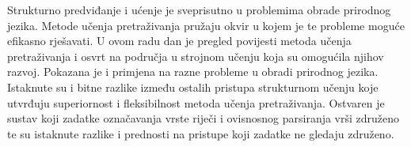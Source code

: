 \begin{sazetak}
Strukturno predviđanje i ućenje je sveprisutno u problemima obrade prirodnog
jezika. Metode učenja pretraživanja pružaju okvir u kojem je te probleme moguće
efikasno rješavati. U ovom radu dan je pregled povijesti metoda učenja
pretraživanja i osvrt na područja u strojnom učenju koja su omogućila njihov
razvoj. Pokazana je i primjena na razne probleme u obradi prirodnog jezika.
Istaknute su i bitne razlike između ostalih pristupa strukturnom učenju koje
utvrđuju superiornost i fleksibilnost metoda učenja pretraživanja. Ostvaren je
sustav koji zadatke označavanja vrste riječi i ovisnosnog parsiranja vrši
združeno te su istaknute razlike i prednosti na pristupe koji zadatke ne gledaju
združeno.

\end{sazetak}
